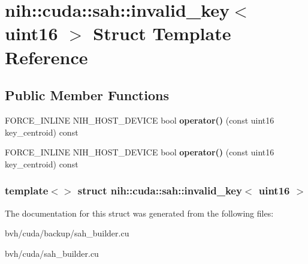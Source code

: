 \hypertarget{structnih_1_1cuda_1_1sah_1_1invalid__key_3_01uint16_01_4}{
\section{nih\-:\-:cuda\-:\-:sah\-:\-:invalid\-\_\-key$<$ uint16 $>$ \-Struct \-Template \-Reference}
\label{structnih_1_1cuda_1_1sah_1_1invalid__key_3_01uint16_01_4}
}
\subsection*{\-Public \-Member \-Functions}
\begin{DoxyCompactItemize}
\item 
\hypertarget{structnih_1_1cuda_1_1sah_1_1invalid__key_3_01uint16_01_4_af510b27f3023c979326860bcd1035864}{
\-F\-O\-R\-C\-E\-\_\-\-I\-N\-L\-I\-N\-E \-N\-I\-H\-\_\-\-H\-O\-S\-T\-\_\-\-D\-E\-V\-I\-C\-E bool {\bfseries operator()} (const uint16 key\-\_\-centroid) const }
\label{structnih_1_1cuda_1_1sah_1_1invalid__key_3_01uint16_01_4_af510b27f3023c979326860bcd1035864}

\item 
\hypertarget{structnih_1_1cuda_1_1sah_1_1invalid__key_3_01uint16_01_4_af510b27f3023c979326860bcd1035864}{
\-F\-O\-R\-C\-E\-\_\-\-I\-N\-L\-I\-N\-E \-N\-I\-H\-\_\-\-H\-O\-S\-T\-\_\-\-D\-E\-V\-I\-C\-E bool {\bfseries operator()} (const uint16 key\-\_\-centroid) const }
\label{structnih_1_1cuda_1_1sah_1_1invalid__key_3_01uint16_01_4_af510b27f3023c979326860bcd1035864}

\end{DoxyCompactItemize}
\subsubsection*{template$<$$>$ struct nih\-::cuda\-::sah\-::invalid\-\_\-key$<$ uint16 $>$}



\-The documentation for this struct was generated from the following files\-:\begin{DoxyCompactItemize}
\item 
bvh/cuda/backup/sah\-\_\-builder.\-cu\item 
bvh/cuda/sah\-\_\-builder.\-cu\end{DoxyCompactItemize}
